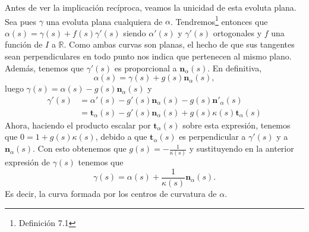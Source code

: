 Antes de ver la implicación recíproca, veamos la unicidad de esta evoluta plana.
Sea pues $\gamma$ una evoluta plana cualquiera de $\alpha$. Tendremos\footnote{Definición 7.1\cite{sanjurjo}} entonces
que $\alpha\left( s \right) = \gamma\left( s \right) + f\left( s
\right)\gamma'\left( s \right)$ siendo $\alpha'\left( s \right)$ y
$\gamma'\left( s \right)$ ortogonales y $f$ una función de $I$ a $\mathbb{R}$.
Como ambas curvas son planas, el hecho de que sus tangentes sean perpendiculares
en todo punto nos indica que pertenecen al mismo plano. Además, tenemos que
$\gamma'\left( s \right)$ es proporcional a $\mathbf{n}_{\alpha}\left( s
\right)$. En definitiva,
\[
\alpha\left( s \right) = \gamma\left( s \right) + g\left( s
\right)\mathbf{n}_{\alpha} \left( s \right),
\]
luego $\gamma\left( s \right) = \alpha\left( s \right) - g\left( s
\right)\mathbf{n}_{\alpha}\left( s \right)$ y
\begin{align*}
    \gamma'\left( s \right) &= \alpha'\left( s \right) - g'\left( s \right)
    \mathbf{n}_{\alpha}\left( s \right) - g\left( s
    \right)\mathbf{n}'_{\alpha}\left( s \right)\\
    &= \mathbf{t}_{\alpha}\left( s \right) - g'\left( s
    \right)\mathbf{n}_{\alpha}\left( s \right) + g\left( s \right)
    \kappa\left( s \right) \mathbf{t}_{\alpha}\left( s \right)
\end{align*}
Ahora, haciendo el producto escalar por $\mathbf{t}_{\alpha}\left( s \right)$
sobre esta expresión, tenemos que $0 = 1 + g\left( s
\right)\kappa\left( s \right)$, debido a que $\mathbf{t}_{\alpha}\left(
s\right)$ es perpendicular a $\gamma'\left( s \right)$ y a
$\mathbf{n}_{\alpha}\left( s \right)$. Con esto obtenemos que $g\left( s \right)
= -\frac{1}{\kappa\left( s \right)}$ y sustituyendo en la anterior
expresión de $\gamma\left( s \right)$ tenemos que
\[
\gamma\left( s \right) = \alpha\left( s \right) + \frac{1}{\kappa\left(
s \right)} \mathbf{n}_{\alpha}\left( s \right).
\]
Es decir, la curva formada por los centros de curvatura de $\alpha$.

